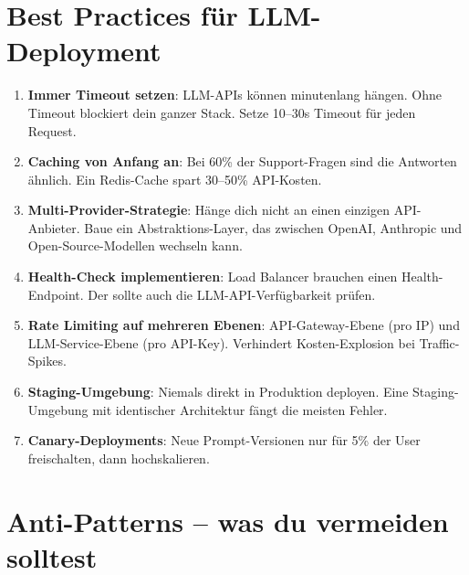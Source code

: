 \section{Best Practices für LLM-Deployment}

\begin{enumerate}[leftmargin=*]
    \item \textbf{Immer Timeout setzen}: LLM-APIs können minutenlang hängen. Ohne Timeout blockiert dein ganzer Stack. Setze 10--30s Timeout für jeden Request.
    \item \textbf{Caching von Anfang an}: Bei 60\% der Support-Fragen sind die Antworten ähnlich. Ein Redis-Cache spart 30--50\% API-Kosten.
    \item \textbf{Multi-Provider-Strategie}: Hänge dich nicht an einen einzigen API-Anbieter. Baue ein Abstraktions-Layer, das zwischen OpenAI, Anthropic und Open-Source-Modellen wechseln kann.
    \item \textbf{Health-Check implementieren}: Load Balancer brauchen einen Health-Endpoint. Der sollte auch die LLM-API-Verfügbarkeit prüfen.
    \item \textbf{Rate Limiting auf mehreren Ebenen}: API-Gateway-Ebene (pro IP) und LLM-Service-Ebene (pro API-Key). Verhindert Kosten-Explosion bei Traffic-Spikes.
    \item \textbf{Staging-Umgebung}: Niemals direkt in Produktion deployen. Eine Staging-Umgebung mit identischer Architektur fängt die meisten Fehler.
    \item \textbf{Canary-Deployments}: Neue Prompt-Versionen nur für 5\% der User freischalten, dann hochskalieren.
\end{enumerate}

\section{Anti-Patterns -- was du vermeiden solltest}

